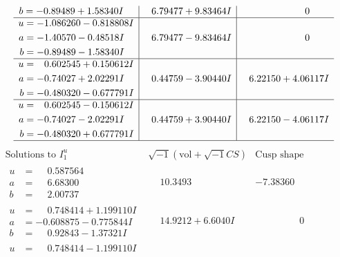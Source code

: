 \documentclass[1p]{elsarticle_modified}
\theoremstyle{definition}
\newcommand{\I}{\sqrt{-1}}
\begin{document}
$$\begin{array}{c|c|c}
\begin{aligned}
b &= -0.89489 + 1.58340 I\end{aligned}
 & \phantom{-}6.79477 + 9.83464 I & \phantom{-0.000000 } 0 \\ \hline\begin{aligned}
u &= -1.086260 - 0.818808 I \\
a &= -1.40570 - 0.48518 I \\
b &= -0.89489 - 1.58340 I\end{aligned}
 & \phantom{-}6.79477 - 9.83464 I & \phantom{-0.000000 } 0 \\ \hline\begin{aligned}
u &= \phantom{-}0.602545 + 0.150612 I \\
a &= -0.74027 + 2.02291 I \\
b &= -0.480320 - 0.677791 I\end{aligned}
 & \phantom{-}0.44759 - 3.90440 I & \phantom{-}6.22150 + 4.06117 I \\ \hline\begin{aligned}
u &= \phantom{-}0.602545 - 0.150612 I \\
a &= -0.74027 - 2.02291 I \\
b &= -0.480320 + 0.677791 I\end{aligned}
 & \phantom{-}0.44759 + 3.90440 I & \phantom{-}6.22150 - 4.06117 I\\
 \hline 
 \end{array}$$\newpage$$\begin{array}{c|c|c}  
\text{Solutions to }I^u_{1}& \I (\text{vol} + \sqrt{-1}CS) & \text{Cusp shape}\\
 \hline 
\begin{aligned}
u &= \phantom{-}0.587564\phantom{ +0.000000I} \\
a &= \phantom{-}6.68300\phantom{ +0.000000I} \\
b &= \phantom{-}2.00737\phantom{ +0.000000I}\end{aligned}
 & \phantom{-}10.3493\phantom{ +0.000000I} & -7.38360\phantom{ +0.000000I} \\ \hline\begin{aligned}
u &= \phantom{-}0.748414 + 1.199110 I \\
a &= -0.608875 - 0.775844 I \\
b &= \phantom{-}0.92843 - 1.37321 I\end{aligned}
 & \phantom{-}14.9212 + 6.6040 I & \phantom{-0.000000 } 0 \\ \hline\begin{aligned}
u &= \phantom{-}0.748414 - 1.199110 I \\

\end{aligned}
\end{array}$$
\end{document}
